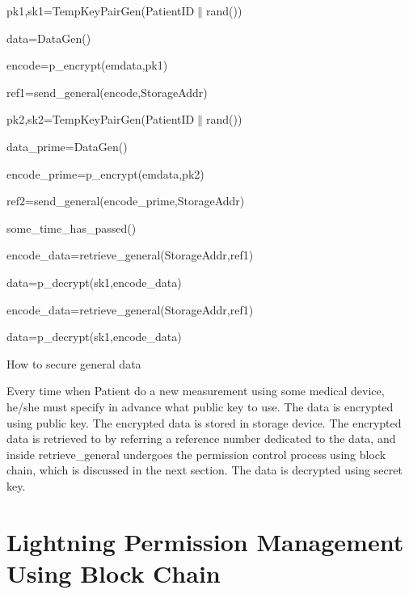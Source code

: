 \documentclass[]{scrartcl}
\theoremstyle{definition}
\begin{document}
\begin{algorithm}[H]
\SetAlgoLined
{}

	pk1,sk1=TempKeyPairGen(PatientID$\|$rand())\;

	data=DataGen()\;

	encode=p\_encrypt(emdata,pk1)\;

	ref1=send\_general(encode,StorageAddr)\;

	pk2,sk2=TempKeyPairGen(PatientID$\|$rand())\;

	data\_prime=DataGen()\;

	encode\_prime=p\_encrypt(emdata,pk2)\;

	ref2=send\_general(encode\_prime,StorageAddr)\;


	some\_time\_has\_passed()\;

	encode\_data=retrieve\_general(StorageAddr,ref1)\;

	data=p\_decrypt(sk1,encode\_data)\;



	encode\_data=retrieve\_general(StorageAddr,ref1)\;

	data=p\_decrypt(sk1,encode\_data)\;


\caption{How to secure general data}

\end{algorithm}

Every time when Patient do a new measurement using some medical device, he/she must specify in advance what public key to use. The data is encrypted using public key. The encrypted data is stored in storage device. The encrypted data is retrieved to by referring a reference number dedicated to the data, and inside retrieve\_general undergoes the permission control process using block chain, which is discussed in the next section. The data is decrypted using secret key. 

\section{Lightning Permission Management Using Block Chain}
\end{document}
